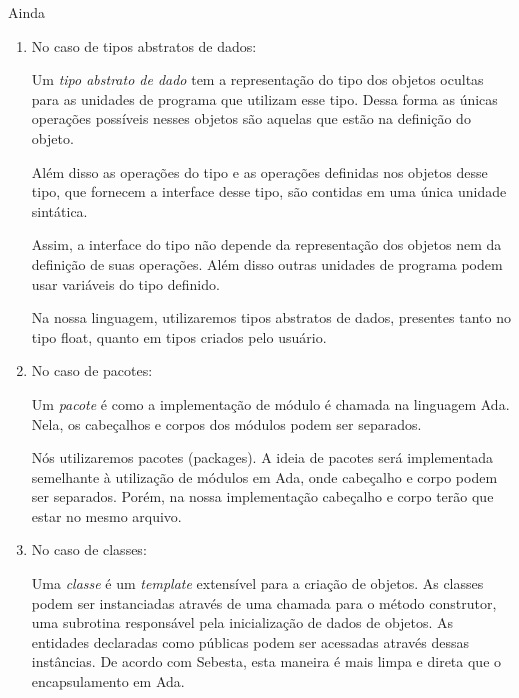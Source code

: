Ainda\begin{enumerate}
        \item
        No caso de tipos abstratos de dados:

        Um \emph{tipo abstrato de dado} tem a representação do tipo dos objetos
        ocultas para as unidades de programa que utilizam esse tipo. Dessa forma as
        únicas operações possíveis nesses objetos são aquelas que estão na
        definição do objeto.

        Além disso as operações do tipo e as operações definidas nos objetos
        desse tipo, que fornecem a interface desse tipo, são contidas em uma
        única unidade sintática.

        Assim,  a interface do tipo não depende da representação dos objetos
        nem da definição de suas operações. Além disso outras unidades de
        programa podem usar variáveis do tipo definido.

        Na nossa linguagem, utilizaremos tipos abstratos de dados, presentes
        tanto no tipo float, quanto em tipos criados pelo usuário.

		\item
		No caso de pacotes:

        Um \emph{pacote} é como a implementação de módulo é chamada na
        linguagem Ada. Nela, os cabeçalhos e corpos dos módulos podem ser
        separados.

        Nós utilizaremos pacotes (packages). A ideia de pacotes será
        implementada semelhante à utilização de módulos em Ada, onde cabeçalho
        e corpo podem ser separados. Porém, na nossa implementação cabeçalho e
        corpo terão que estar no mesmo arquivo.

        \item
        No caso de classes:

        Uma \emph{classe} é um \emph{template} extensível para a criação de
        objetos. As classes podem ser instanciadas através de uma chamada para
        o método construtor, uma subrotina responsável pela inicialização de
        dados de objetos. As entidades declaradas como públicas podem ser
        acessadas através dessas instâncias. De acordo com Sebesta, esta
        maneira é mais limpa e direta que o encapsulamento em Ada.


\end{enumerate}
